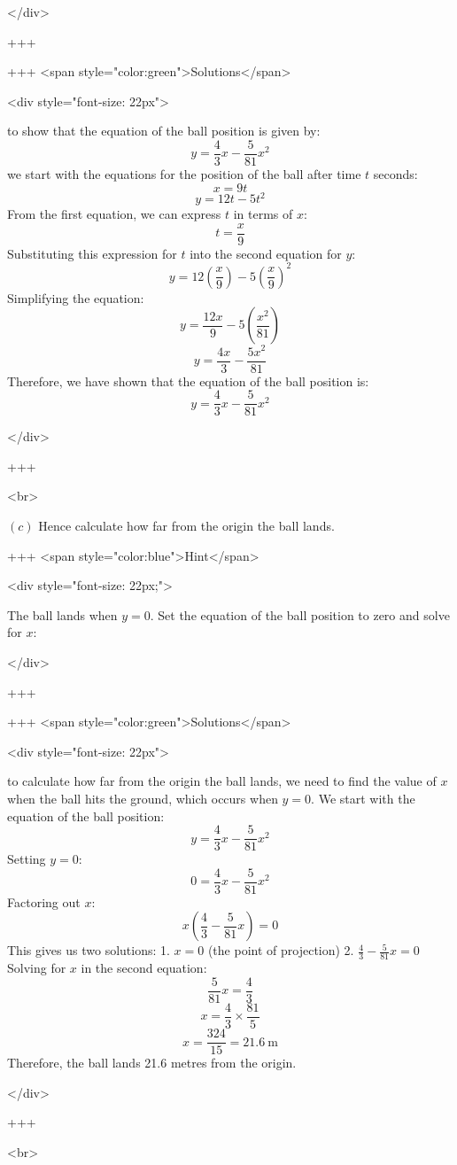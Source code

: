</div>

+++

+++ <span style="color:green">Solutions</span>

<div style="font-size: 22px">

to show that the equation of the ball position is given by:
$$ y = \frac{4}{3} x - \frac{5}{81} x^2 $$
we start with the equations for the position of the ball after time $t$ seconds:
$$ x = 9t $$
$$ y = 12t - 5t^2 $$
From the first equation, we can express $t$ in terms of $x$:
$$ t = \frac{x}{9} $$
Substituting this expression for $t$ into the second equation for $y$:
$$ y = 12\left(\frac{x}{9}\right) - 5\left(\frac{x}{9}\right)^2 $$
Simplifying the equation:
$$ y = \frac{12x}{9} - 5\left(\frac{x^2}{81}\right) $$
$$ y = \frac{4x}{3} - \frac{5x^2}{81} $$
Therefore, we have shown that the equation of the ball position is:
$$ y = \frac{4}{3} x - \frac{5}{81} x^2 $$

</div>

+++

<br>


\((c)\) Hence calculate how far from the origin the ball lands.

+++ <span style="color:blue">Hint</span>

<div style="font-size: 22px;">

The ball lands when $y = 0$. Set the equation of the ball position to zero and solve for $x$:

</div>

+++

+++ <span style="color:green">Solutions</span>

<div style="font-size: 22px">

to calculate how far from the origin the ball lands, we need to find the value of $x$ when the ball hits the ground, which occurs when $y = 0$.
We start with the equation of the ball position:
$$ y = \frac{4}{3} x - \frac{5}{81} x^2 $$
Setting $y = 0$:
$$ 0 = \frac{4}{3} x - \frac{5}{81} x^2 $$
Factoring out $x$:
$$ x\left(\frac{4}{3} - \frac{5}{81} x\right) = 0 $$
This gives us two solutions:
1. \( x = 0 \) (the point of projection)
2. \( \frac{4}{3} - \frac{5}{81} x = 0 \)
Solving for $x$ in the second equation:
$$ \frac{5}{81} x = \frac{4}{3} $$
$$ x = \frac{4}{3} \times \frac{81}{5} $$
$$ x = \frac{324}{15} = 21.6 \mathrm{~m} $$
Therefore, the ball lands 21.6 metres from the origin.

</div>

+++

<br>

